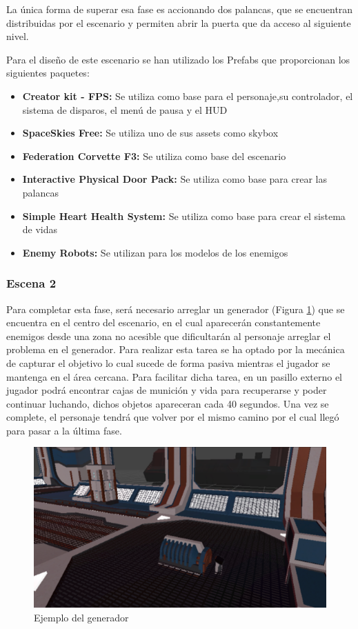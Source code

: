 La única forma de superar esa fase es accionando dos palancas, que se encuentran distribuidas por el escenario y permiten abrir la puerta que da acceso al siguiente nivel.

Para el diseño de este escenario se han utilizado los Prefabs que proporcionan los siguientes paquetes:
\begin{itemize}
	\item \textbf {Creator kit - FPS:} Se utiliza como base para el personaje,su controlador, el sistema de disparos, el menú de pausa y el HUD
	\item \textbf{SpaceSkies Free:} Se utiliza uno de sus assets como skybox
	\item \textbf{Federation Corvette F3:} Se utiliza como base del escenario
	\item \textbf{Interactive Physical Door Pack:} Se utiliza como base para crear las palancas
	\item \textbf{Simple Heart Health System:} Se utiliza como base para crear el sistema de vidas
	\item \textbf{Enemy Robots:} Se utilizan para los modelos de los enemigos
\end{itemize}


\subsubsection{Escena 2}
Para completar esta fase, será necesario arreglar un generador (Figura \ref{fig:Generador}) que se encuentra en el centro del escenario, en el cual aparecerán constantemente enemigos desde una zona no acesible que dificultarán al personaje arreglar el problema en el generador. Para realizar esta tarea se ha optado por la mecánica de capturar el objetivo lo cual sucede de forma pasiva mientras el jugador se mantenga en el área cercana. Para facilitar dicha tarea, en un pasillo externo el jugador podrá encontrar cajas de munición y vida para recuperarse y poder continuar luchando, dichos objetos apareceran cada 40 segundos. Una vez se complete, el personaje tendrá que volver por el mismo camino por el cual llegó para pasar a la última fase.

\begin{figure}[H]
	\centering
	\includegraphics[scale=0.75]{imagenes/Generador.png}
	\caption{\label{fig:Generador}Ejemplo del generador}
\end{figure}

